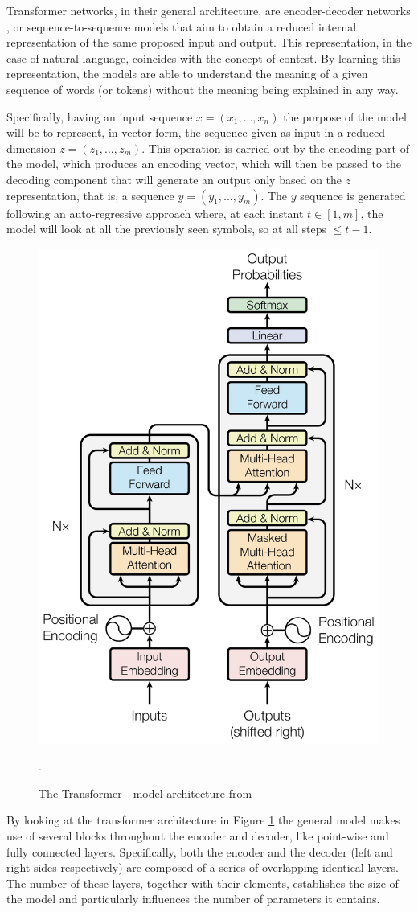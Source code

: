 Transformer networks, in their general architecture, are encoder-decoder networks \citep{cho-etal-2014-learning}, or sequence-to-sequence models that aim to obtain a reduced internal representation of the same proposed input and output. This representation, in the case of natural language, coincides with the concept of contest. By learning this representation, the models are able to understand the meaning of a given sequence of words (or tokens) without the meaning being explained in any way.

Specifically, having an input sequence $x = (x_1, ..., x_n)$ the purpose of the model will be to represent, in vector form, the sequence given as input in a reduced dimension $z = (z_1, ..., z_m)$. This operation is carried out by the encoding part of the model, which produces an encoding vector, which will then be passed to the decoding component that will generate an output only based on the $z$ representation, that is, a sequence $y = (y_1, ..., y_m)$. The  $y$ sequence is generated following an auto-regressive approach where, at each instant $t \in [1, m]$,  the model will look at all the previously seen symbols, so at all steps $\leq t - 1$.

\begin{figure}
    \centering
    \includegraphics[width=0.4\linewidth]{Figs/transformer.png}
    \caption{The Transformer - model architecture from \citep{DBLP:journals/corr/VaswaniSPUJGKP17}}.
    \label{fig:transformers-arch}
\end{figure}

By looking at the transformer architecture in Figure \ref{fig:transformers-arch} the general model makes use of several blocks throughout the encoder and decoder, like point-wise and fully connected layers. Specifically, both the encoder and the decoder (left and right sides respectively) are composed of a series of overlapping identical layers. The number of these layers, together with their elements, establishes the size of the model and particularly influences the number of parameters it contains. 

